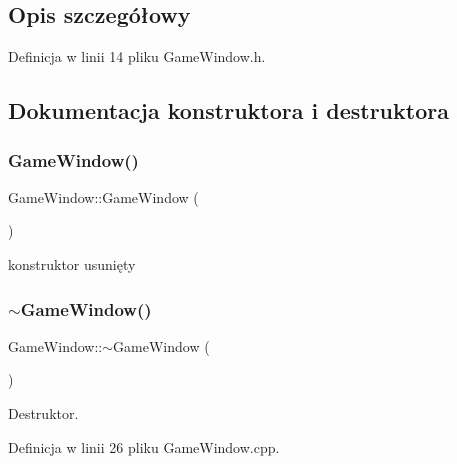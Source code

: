 \subsection{Opis szczegółowy}


Definicja w linii 14 pliku Game\+Window.\+h.



\subsection{Dokumentacja konstruktora i destruktora}
\mbox{\label{class_game_window_aeb8fe4d63cdd9e9d3e6fdcb35d15a37c}} 
\subsubsection{\texorpdfstring{Game\+Window()}{GameWindow()}\hspace{0.1cm}{\footnotesize\ttfamily [1/2]}}
{\footnotesize\ttfamily Game\+Window\+::\+Game\+Window (\begin{DoxyParamCaption}{ }\end{DoxyParamCaption})\hspace{0.3cm}{\ttfamily [delete]}}



konstruktor usunięty 

\mbox{\label{class_game_window_a55b071c0390e45c064a160c1e6baaa08}} 
\subsubsection{\texorpdfstring{$\sim$\+Game\+Window()}{~GameWindow()}}
{\footnotesize\ttfamily Game\+Window\+::$\sim$\+Game\+Window (\begin{DoxyParamCaption}{ }\end{DoxyParamCaption})}



Destruktor. 



Definicja w linii 26 pliku Game\+Window.\+cpp.

\mbox{\label{class_game_window_a22da49d930c2fd26888b223049a9da18}} 

